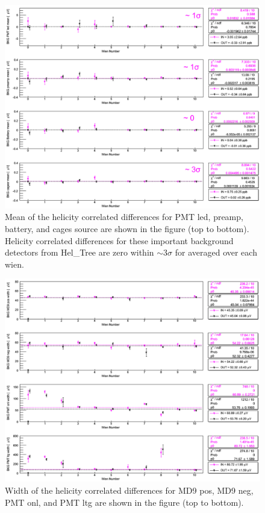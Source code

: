 \begin{singlespace}
\begin{figure}[!h]
	\centering
	\includegraphics[width=15.0cm]{figures/pedestalDiffBkgOther}
	\caption
	{Mean of the helicity correlated differences for PMT led, preamp, battery, and cages source are shown in the figure (top to bottom). Helicity correlated differences for these important background detectors from Hel\_Tree are zero within $\sim$3$\sigma$ for averaged over each wien.}
	\label{fig:pedestalDiffBkgOther}
\end{figure}
\end{singlespace}

\begin{singlespace}
\begin{figure}[!h]
	\centering
	\includegraphics[width=15.0cm]{figures/pedestalDiffBkgWidth}
	\caption
	{Width of the helicity correlated differences for MD9 pos, MD9 neg, PMT onl, and PMT ltg are shown in the figure (top to bottom).}
	\label{fig:pedestalDiffBkgWidth}
\end{figure}
\end{singlespace}

